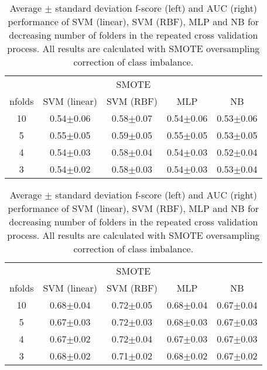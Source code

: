 \documentclass[10pt,leqno]{amsart}
\begin{document}
\begin{table}[!htbp]
\centering
\footnotesize
\caption{Average $\pm$ standard deviation f-score (left) and AUC (right) performance of SVM (linear), SVM (RBF), MLP and NB for decreasing number of folders in the repeated cross validation process. All results are calculated with SMOTE oversampling correction of class imbalance.}
\label{tab:f_auc}
\begin{tabular}{*5c}
\toprule
  \multicolumn{5}{c}{SMOTE} \\
nfolds & SVM (linear) & SVM (RBF) & MLP & NB
\\
\midrule
10 & 0.54$\pm$0.06 & 0.58$\pm$0.07 & 0.54$\pm$0.06 & 0.53$\pm$0.06
\\
5 & 0.55$\pm$0.05 & 0.59$\pm$0.05 & 0.55$\pm$0.05 & 0.53$\pm$0.05
\\
4 & 0.54$\pm$0.03 & 0.58$\pm$0.04 & 0.54$\pm$0.03 & 0.52$\pm$0.04
\\
3 & 0.54$\pm$0.02 & 0.58$\pm$0.03 & 0.54$\pm$0.03 & 0.53$\pm$0.04
\\
\bottomrule
\end{tabular}
\quad
\begin{tabular}{*5c}
\toprule
  \multicolumn{5}{c}{SMOTE} \\
nfolds & SVM (linear) & SVM (RBF) & MLP & NB
\\
\midrule
10 & 0.68$\pm$0.04 & 0.72$\pm$0.05 & 0.68$\pm$0.04 & 0.67$\pm$0.04
\\
5 & 0.67$\pm$0.03 & 0.72$\pm$0.03 & 0.68$\pm$0.03 & 0.67$\pm$0.03
\\
4 & 0.67$\pm$0.02 & 0.72$\pm$0.04 & 0.67$\pm$0.03 & 0.67$\pm$0.03
\\
3 & 0.68$\pm$0.02 & 0.71$\pm$0.02 & 0.68$\pm$0.02 & 0.67$\pm$0.02
\\
\bottomrule
\end{tabular}

\end{table}

 
\end{document}
